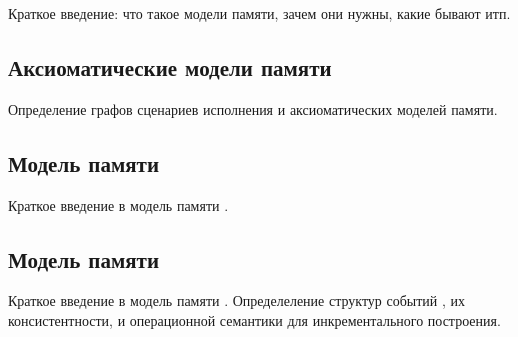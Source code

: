 \pagebreak


Краткое введение: что такое модели памяти, зачем они нужны, какие бывают итп.

\subsection*{Аксиоматические модели памяти}

Определение графов сценариев исполнения и аксиоматических моделей памяти. 

\subsection*{Модель памяти \IMM}

Краткое введение в модель памяти \IMM.

\subsection*{Модель памяти \Wkm}

Краткое введение в модель памяти \Wkm.
Определеление структур событий \Wkm,
их консистентности, и операционной семантики
для инкрементального построения. 

